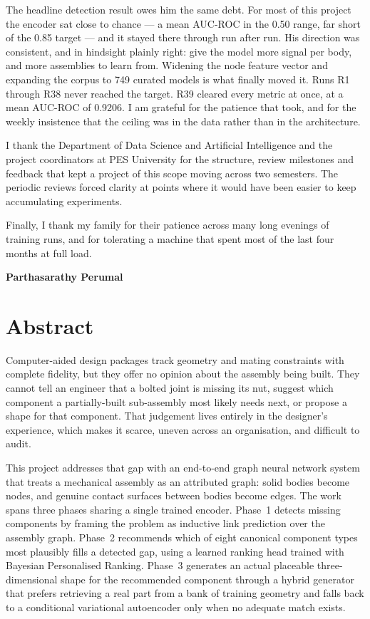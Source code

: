 \documentclass[12pt,oneside,a4paper]{report}
\begin{document}
The headline detection result owes him the same debt. For most of this
project the encoder sat close to chance --- a mean AUC-ROC in the 0.50 range,
far short of the 0.85 target --- and it stayed there through run after run.
His direction was consistent, and in hindsight plainly right: give the model
more signal per body, and more assemblies to learn from. Widening the node
feature vector and expanding the corpus to 749 curated models is what finally
moved it. Runs R1 through R38 never reached the target. R39 cleared every
metric at once, at a mean AUC-ROC of 0.9206. I am grateful for the patience
that took, and for the weekly insistence that the ceiling was in the data
rather than in the architecture.

I thank the Department of Data Science and Artificial Intelligence and the
project coordinators at PES University for the structure, review milestones
and feedback that kept a project of this scope moving across two semesters.
The periodic reviews forced clarity at points where it would have been easier
to keep accumulating experiments.

Finally, I thank my family for their patience across many long evenings of
training runs, and for tolerating a machine that spent most of the last four
months at full load.

\vspace{1.5cm}
\begin{flushright}
\textbf{Parthasarathy Perumal}
\end{flushright}

\chapter*{Abstract}
\thispagestyle{plain}

Computer-aided design packages track geometry and mating constraints with
complete fidelity, but they offer no opinion about the assembly being built.
They cannot tell an engineer that a bolted joint is missing its nut, suggest
which component a partially-built sub-assembly most likely needs next, or
propose a shape for that component. That judgement lives entirely in the
designer's experience, which makes it scarce, uneven across an organisation,
and difficult to audit.

This project addresses that gap with an end-to-end graph neural network
system that treats a mechanical assembly as an attributed graph: solid bodies
become nodes, and genuine contact surfaces between bodies become edges. The
work spans three phases sharing a single trained encoder. Phase~1 detects
missing components by framing the problem as inductive link prediction over
the assembly graph. Phase~2 recommends which of eight canonical component
types most plausibly fills a detected gap, using a learned ranking head
trained with Bayesian Personalised Ranking. Phase~3 generates an actual
placeable three-dimensional shape for the recommended component through a
hybrid generator that prefers retrieving a real part from a bank of training
geometry and falls back to a conditional variational autoencoder only when no
adequate match exists.
\end{document}
